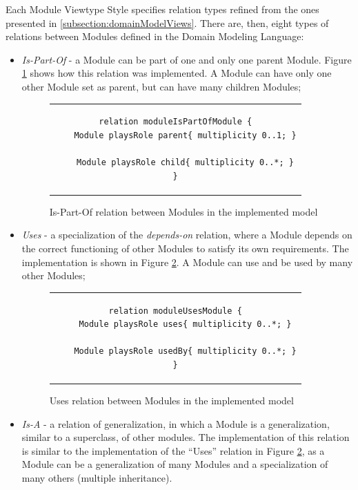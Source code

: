 Each Module Viewtype Style specifies relation types refined from the ones presented in \ref{subsection:domainModelViews}. There are, then, eight types of relations between Modules\cite{clements2003documenting} defined in the Domain Modeling Language:
\begin{itemize}
\item \textit{Is-Part-Of} - a Module can be part of one and only one parent Module. Figure \ref{figure:modelIsPartOfRelation} shows how this relation was implemented. A Module can have only one other Module set as parent, but can have many children Modules;
\begin{figure}[h]
\centering
\lstset{style=customjava}
\begin{tabular}{c}
\begin{lstlisting}
relation moduleIsPartOfModule {
	Module playsRole parent{ multiplicity 0..1; }
	
	Module playsRole child{ multiplicity 0..*; }
}
\end{lstlisting}
\end{tabular}
\caption{Is-Part-Of relation between Modules in the implemented model}
\label{figure:modelIsPartOfRelation}
\end{figure}

\item \textit{Uses} - a specialization of the \textit{depends-on} relation, where a Module depends on the correct functioning of other Modules to satisfy its own requirements. The implementation is shown in Figure \ref{figure:modelUsesRelation}. A Module can use and be used by many other Modules;
\begin{figure}[h]
\centering
\lstset{style=customjava}
\begin{tabular}{c}
\begin{lstlisting}
relation moduleUsesModule {
	Module playsRole uses{ multiplicity 0..*; }
	
	Module playsRole usedBy{ multiplicity 0..*; }
}
\end{lstlisting}
\end{tabular}
\caption{Uses relation between Modules in the implemented model}
\label{figure:modelUsesRelation}
\end{figure}

\item \textit{Is-A} - a relation of generalization, in which a Module is a generalization, similar to a superclass, of other modules. The implementation of this relation is similar to the implementation of the ``Uses'' relation in Figure \ref{figure:modelUsesRelation}, as a Module can be a generalization of many Modules and a specialization of many others (multiple inheritance).


\end{itemize}
